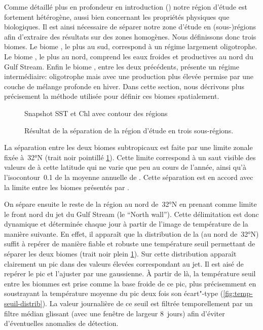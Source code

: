 Comme détaillé plus en profondeur en introduction () notre région d'étude est fortement hétérogène, aussi bien concernant les propriétés physiques que biologiques.
Il est ainsi nécessaire de séparer notre zone d'étude en (sous-)régions afin d'extraire des résultats sur des zones homogènes.
Nous définissons donc trois biomes.
Le biome , le plus au sud, correspond à un régime largement oligotrophe.
Le biome , le plus au nord, comprend les eaux froides et productives au nord du Gulf Stream.
Enfin le biome , entre les deux précédents, présente un régime intermédiaire: oligotrophe mais avec une production plus élevée permise par une couche de mélange profonde en hiver.
Dans cette section, nous décrivons plus précisement la méthode utilisée pour définir ces biomes spatialement.

\begin{figure}
  Snapshot SST et Chl avec contour des régions
  \caption[Séparation de la région d'étude en sous-régions]{
    Résultat de la séparation de la région d'étude en trois sous-régions.
  }
  \label{fig:separation-regions}
\end{figure}

La séparation entre les deux biomes subtropicaux est faite par une limite zonale fixée à~\ang{32}N (trait noir pointillé \cref{fig:separation-regions}).
Cette limite correspond à un saut visible des valeurs de  à cette latitude qui ne varie que peu au cours de l'année, ainsi qu'à l'isocontour~\qty{0.1}{\mgm} de la moyenne annuelle de .
Cette séparation est en accord avec la limite entre les biomes présentés par \textcite{sarmiento_2004}.

On sépare ensuite le reste de la région au nord de~\ang{32}N en prenant comme limite le front nord du jet du Gulf Stream (le \enquote{North wall}).
Cette délimitation est donc dynamique et déterminée chaque jour à partir de l'image de température de la manière suivante.
En effet, il apparaît que la distribution de la  (au nord de~\ang{32}N) suffit à repérer de manière fiable et robuste une température seuil permettant de séparer les deux biomes (trait noir plein \cref{fig:separation-regions}).
Sur cette distribution apparaît clairement un pic dans des valeurs élevées correspondant au jet.
Il est aisé de repérer le pic et l'ajuster par une gaussienne.
À partir de là, la température seuil entre les biommes est prise comme la base froide de ce pic,  plus précisemment en soustrayant la température moyenne du pic  deux fois son écart"-type (\cref{fig:temp-seuil-distrib}).
La valeur journalière de ce seuil est filtrée temporellement par un filtre médian glissant (avec une fenêtre de largeur 8~jours) afin d'éviter d'éventuelles anomalies de détection.

